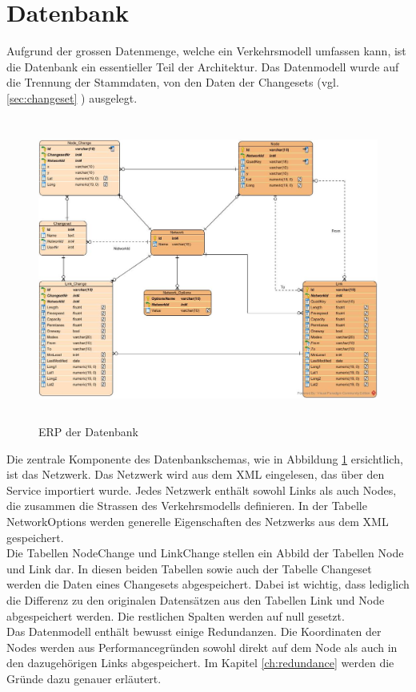 \section{Datenbank}
Aufgrund der grossen Datenmenge, welche ein Verkehrsmodell umfassen kann, ist die Datenbank ein essentieller Teil der Architektur. Das Datenmodell wurde auf die Trennung der Stammdaten, von den Daten der Changesets (vgl. \ref{sec:changeset} ) ausgelegt.\\
\begin{figure}[H]
\centering
\includegraphics[height=10cm]{images/SimmapDatabase.jpg}
\caption{ERP der Datenbank}
\label{fig:databasescheme}
\end{figure}
\noindent
Die zentrale Komponente des Datenbankschemas, wie in Abbildung \ref{fig:databasescheme} ersichtlich, ist das Netzwerk. Das Netzwerk wird aus dem XML eingelesen, das über den Service importiert wurde. Jedes Netzwerk enthält sowohl Links als auch Nodes, die zusammen die Strassen des Verkehrsmodells definieren. In der Tabelle Network\textunderscore Options werden generelle Eigenschaften des Netzwerks aus dem XML gespeichert.\\
Die Tabellen Node\textunderscore Change und Link\textunderscore Change stellen ein Abbild der Tabellen Node und Link dar. In diesen beiden Tabellen sowie auch der Tabelle Changeset werden die Daten eines Changesets abgespeichert. Dabei ist wichtig, dass lediglich die Differenz zu den originalen Datensätzen aus den Tabellen Link und Node abgespeichert werden. Die restlichen Spalten werden auf null gesetzt.\\
Das Datenmodell enthält bewusst einige Redundanzen. Die Koordinaten der Nodes werden aus Performancegründen sowohl direkt auf dem Node als auch in den dazugehörigen Links abgespeichert. Im Kapitel \ref{ch:redundance}  werden die Gründe dazu genauer erläutert.